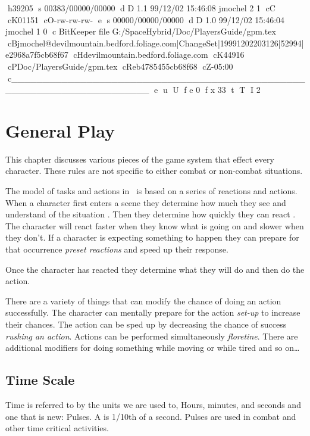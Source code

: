 h39205
s 00383/00000/00000
d D 1.1 99/12/02 15:46:08 jmochel 2 1
cC
cK01151
cO-rw-rw-rw-
e
s 00000/00000/00000
d D 1.0 99/12/02 15:46:04 jmochel 1 0
c BitKeeper file G:/SpaceHybrid/Doc/PlayersGuide/gpm.tex
cBjmochel@devilmountain.bedford.foliage.com|ChangeSet|19991202203126|52994|e2968a7f5cb68f67
cHdevilmountain.bedford.foliage.com
cK44916
cPDoc/PlayersGuide/gpm.tex
cReb4785455cb68f68
cZ-05:00
c______________________________________________________________________
e
u
U
f e 0
f x 33
t
T
I 2
\chapter{General Play}

This chapter discusses various pieces of the game system that effect 
every character. These rules are not specific to either combat or 
non-combat situations.  

The model of tasks and actions in \SH\ is based on a series of 
reactions and actions. When a character first enters a scene
they determine how much they see and understand of the situation {\em
{}}. Then they determine how quickly they can react {\em 
{}}. The character will react faster when they know what
is going on and slower when they don't. If a character is expecting 
something to happen they can prepare for that occurrence {\em preset 
reactions} and speed up their response. 

Once the character has reacted they determine what they will do and then 
do the action. 

There are a variety of things that can modify the chance of doing an 
action successfully. The character can mentally prepare for the 
action {\em set-up} to increase their chances. The action can be sped 
up by decreasing the chance of success {\em rushing an action}. 
Actions can be performed simultaneously {\em floretine}. There are 
additional modifiers for doing something while moving or while tired 
and so on\dots

\section{Time Scale}

Time is referred to by the units we are used to, Hours, minutes, and seconds 
and one that is new: Pulses. A  is 1/10th of a second. Pulses are
used in combat and other time critical activities.

